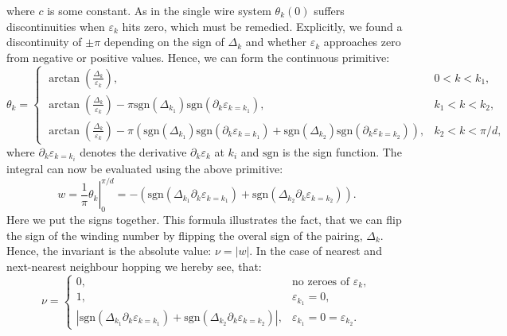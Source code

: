 where $c$ is some constant. As in the single wire system $\theta_k(0)$ suffers discontinuities when $\varepsilon_k$ hits zero, which must be remedied. Explicitly, we found a discontinuity of $\pm \pi$ depending on the sign of $\Delta_k$ and whether $\varepsilon_k$ approaches zero from negative or positive values. Hence, we can form the continuous primitive:
\begin{equation}
\theta_k = \left\{ \begin{matrix} 
\arctan\left(\frac{\Delta_k}{\varepsilon_k}\right), & 0 < k < k_1, \\
\arctan\left(\frac{\Delta_k}{\varepsilon_k}\right) - \pi\text{sgn}(\Delta_{k_1})\text{sgn}\left(\partial_k\varepsilon_{k = k_1}\right), & k_1 < k < k_2, \\
\arctan\left(\frac{\Delta_k}{\varepsilon_k}\right) - \pi\left(\text{sgn}(\Delta_{k_1})\text{sgn}\left(\partial_k\varepsilon_{k = k_1}\right) + \text{sgn}(\Delta_{k_2})\text{sgn}\left(\partial_k\varepsilon_{k = k_2}\right)\right), & k_2 < k < \pi / d,
  \end{matrix} \right. \nonumber 
\end{equation}
where $\partial_k\varepsilon_{k = k_i}$ denotes the derivative $\partial_k\varepsilon_k$ at $k_i$ and $\text{sgn}$ is the sign function. The integral can now be evaluated using the above primitive:
\begin{equation}
w = \left.\frac{1}{\pi}\theta_k\right|^{\pi / d}_{0} = -\left( \text{sgn}\left(\Delta_{k_1}\partial_k\varepsilon_{k = k_1}\right) + \text{sgn}\left(\Delta_{k_2}\partial_k\varepsilon_{k = k_2}\right) \right). \nonumber
\end{equation}
Here we put the signs together. This formula illustrates the fact, that we can flip the sign of the winding number by flipping the overal sign of the pairing, $\Delta_k$. Hence, the invariant is the absolute value: $\nu = |w|$. In the case of nearest and next-nearest neighbour hopping we hereby see, that:
\begin{equation}
\nu = \left\{ \begin{matrix} 	0, 								& \text{no zeroes of } \varepsilon_k, \\
								1, 								& \varepsilon_{k_1} = 0, \\
								\left|\text{sgn}(\Delta_{k_1}\partial_k\varepsilon_{k = k_1}) + \text{sgn}(\Delta_{k_2}\partial_k\varepsilon_{k = k_2})\right|,   & \varepsilon_{k_1} = 0 = \varepsilon_{k_2}.
\end{matrix} \right. \nonumber
\end{equation}
